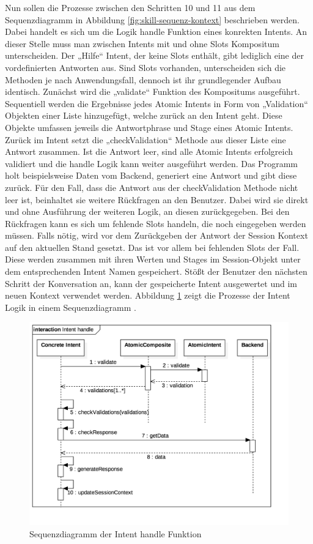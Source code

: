 Nun sollen die Prozesse zwischen den Schritten 10 und 11 aus dem Sequenzdiagramm in Abbildung \ref{fig:skill-sequenz-kontext} beschrieben werden. Dabei handelt es sich um die Logik \bzw handle Funktion eines konrekten Intents. An dieser Stelle muss man zwischen Intents mit und ohne Slots \bzw Kompositum unterscheiden. Der „Hilfe“ Intent, der keine Slots enthält, gibt lediglich eine der vordefinierten Antworten aus. Sind Slots vorhanden, unterscheiden sich die Methoden je nach Anwendungsfall, dennoch ist ihr grundlegender Aufbau identisch. Zunächst wird die „validate“ Funktion des Kompositums ausgeführt. Sequentiell werden die Ergebnisse jedes Atomic Intents in Form von „Validation“ Objekten einer Liste hinzugefügt, welche zurück an den Intent geht. Diese Objekte umfassen jeweils die Antwortphrase und Stage eines Atomic Intents. Zurück im Intent setzt die „checkValidation“ Methode aus dieser Liste eine Antwort zusammen. Ist die Antwort leer, sind alle Atomic Intents erfolgreich validiert und die handle Logik kann weiter ausgeführt werden. Das Programm holt beispielsweise Daten vom Backend, generiert eine Antwort und gibt diese zurück. Für den Fall, dass die Antwort aus der checkValidation Methode nicht leer ist, beinhaltet sie weitere Rückfragen an den Benutzer. Dabei wird sie direkt und ohne Ausführung der weiteren Logik, an diesen zurückgegeben. Bei den Rückfragen kann es sich um fehlende Slots handeln, die noch eingegeben werden müssen. Falls nötig, wird vor dem Zurückgeben der Antwort der Session Kontext auf den aktuellen Stand gesetzt. Das ist vor allem bei fehlenden Slots der Fall. Diese werden zusammen mit ihren Werten und Stages im Session-Objekt unter dem entsprechenden Intent Namen gespeichert. Stößt der Benutzer den nächsten Schritt der Konversation an, kann der gespeicherte Intent ausgewertet und im neuen Kontext verwendet werden.  Abbildung \ref{fig:skill-sequenz-handle} zeigt die Prozesse der Intent Logik in einem Sequenzdiagramm .

\begin{figure}[!htb]
    \centering
    \includegraphics[width=1.0\textwidth]{bilder/4_skillSequenzIntentHandle.png}
    \caption{Sequenzdiagramm der Intent handle Funktion}
    \label{fig:skill-sequenz-handle}
\end{figure}

